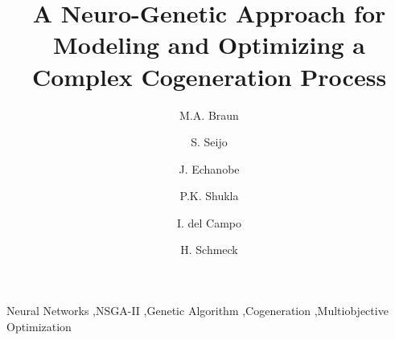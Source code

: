 \documentclass[preprint,12pt,authoryear]{elsarticle}
\begin{document}
\begin{frontmatter}



\title{A Neuro-Genetic Approach for Modeling and Optimizing a Complex Cogeneration Process}


\author[kit]{M.A. Braun}
\author[upv]{S. Seijo}
\author[upv]{J. Echanobe}
\author[kit]{P.K. Shukla}
\author[upv]{I. del Campo}
\author[kit]{H. Schmeck}

\address[upv]{Department of Electricity and Electronics, UPV/EHU, Spain}
\address[kit]{Institute AIFB, KIT, Karlsruhe, Germany}

\begin{abstract}

\end{abstract}

\begin{keyword}
Neural Networks \sep NSGA-II \sep Genetic Algorithm \sep Cogeneration \sep Multiobjective Optimization


\end{keyword}

\end{frontmatter}







\end{document}
